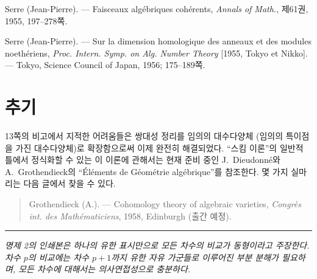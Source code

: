 \noindent[3] Serre (Jean-Pierre). --- Faisceaux algébriques cohérents,
\emph{Annals of Math.}, 제61권, 1955, 197--278쪽.

\noindent[4] Serre (Jean-Pierre). --- Sur la dimension homologique des anneaux
et des modules noethériens, \emph{Proc. Intern. Symp. on Alg. Number Theory}
[1955, Tokyo et Nikko]. --- Tokyo, Science Council of Japan, 1956;
175--189쪽.

\clearpage
{}
\section*{추기}

13쪽의 비고에서 지적한 어려움들은 쌍대성 정리를 임의의 대수다양체
(임의의 특이점을 가진 대수다양체)로 확장함으로써 이제 완전히
해결되었다. ``스킴 이론''의 일반적 틀에서 정식화할 수 있는 이 이론에
관해서는 현재 준비 중인 J.~Dieudonné와 A.~Grothendieck의
``Éléments de Géométrie algébrique''를 참조한다. 몇 가지 실마리는 다음
글에서 찾을 수 있다.

\begin{quote}
Grothendieck (A.). --- Cohomology theory of algebraic varieties,
\emph{Congrès int. des Mathématiciens}, 1958, Edinburgh (출간 예정).
\end{quote}

\begin{flushright}
[1959년 4월]
\end{flushright}

\begin{center}\rule{36mm}{0.5pt}\end{center}

\par\smallskip
\begingroup\footnotesize




\noindent\textit{명제 2의 인쇄본은 하나의 유한 표시만으로 모든 차수의 비교가 동형이라고 주장한다. 차수 $p$의 비교에는 차수 $p+1$까지 유한 자유 가군들로 이루어진 부분 분해가 필요하며, 모든 차수에 대해서는 의사연접성으로 충분하다.}\par
\endgroup
